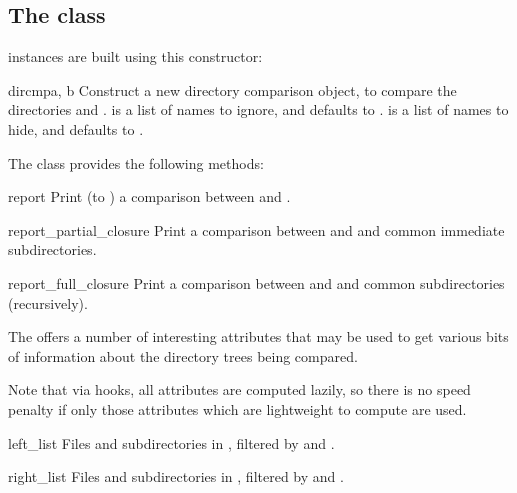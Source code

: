\subsection{The \protect{} class \label{dircmp-objects}}

 instances are built using this constructor:

\begin{classdesc}{dircmp}{a, b}
Construct a new directory comparison object, to compare the
directories  and .  is a list of names to
ignore, and defaults to .  is a
list of names to hide, and defaults to .
\end{classdesc}

The  class provides the following methods:

\begin{methoddesc}[dircmp]{report}{}
Print (to ) a comparison between  and .
\end{methoddesc}

\begin{methoddesc}[dircmp]{report_partial_closure}{}
Print a comparison between  and  and common immediate
subdirectories.
\end{methoddesc}

\begin{methoddesc}[dircmp]{report_full_closure}{}
Print a comparison between  and  and common 
subdirectories (recursively).
\end{methoddesc}


The  offers a number of interesting attributes that may
be used to get various bits of information about the directory trees
being compared.

Note that via  hooks, all attributes are
computed lazily, so there is no speed penalty if only those
attributes which are lightweight to compute are used.

\begin{memberdesc}[dircmp]{left_list}
Files and subdirectories in , filtered by  and
.
\end{memberdesc}

\begin{memberdesc}[dircmp]{right_list}
Files and subdirectories in , filtered by  and
.
\end{memberdesc}

